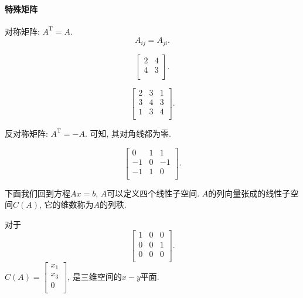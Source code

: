 \paragraph{特殊矩阵}
对称矩阵: $A^{\mathrm{T}}=A$.
\begin{equation}
  A_{ij}=A_{ji}.
\end{equation}
\begin{example}
    \begin{equation}
      \begin{bmatrix}
       2 & 4\\
       4 & 3\\
      \end{bmatrix}.
    \end{equation}
\end{example}
\begin{example}
    \begin{equation}
      \begin{bmatrix}
       2 & 3 & 1\\
       3 & 4 & 3\\
       1 & 3 & 4\\
      \end{bmatrix}.
    \end{equation}
\end{example}

反对称矩阵: $A^{\mathrm{T}} = -A$.
可知, 其对角线都为零.

\begin{example}
    \begin{equation}
      \begin{bmatrix}
       0 & 1 & 1\\
       -1 & 0 & -1\\
       -1 & 1 & 0\\
      \end{bmatrix}.
    \end{equation}
\end{example}

下面我们回到方程$Ax=b$, $A$可以定义四个线性子空间.
$A$的列向量张成的线性子空间$C(A)$, 它的维数称为$A$的列秩.
\begin{example}
    对于 $$
    \begin{bmatrix}
     1 & 0 & 0\\
     0 & 0 & 1\\
     0 & 0 & 0\\
    \end{bmatrix}.
    $$
    $C(A) = \begin{bmatrix}
     x_1\\
     x_3\\
     0\\
    \end{bmatrix}$, 是三维空间的$x-y$平面.
\end{example}

